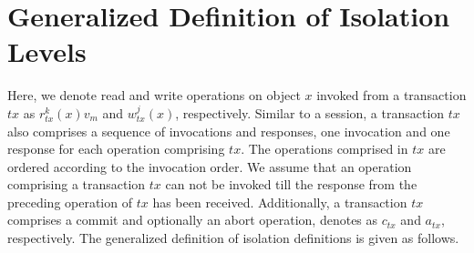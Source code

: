 \documentclass[acmlarge, ,11pt]{acmart}
\begin{document}


 \section{Generalized Definition of Isolation Levels}
 Here, we denote read and write operations on object $x$ invoked from a transaction $\mathit{tx}$ as $r^k_{\mathit{tx}}(x){v_m}$ and $w^j_{\mathit{tx}}(x)$, respectively. Similar to a session, a transaction ${\mathit{tx}}$ also comprises a sequence of invocations and responses, one invocation and one response for each operation comprising ${\mathit{tx}}$. The operations comprised in ${\mathit{tx}}$ are ordered according to the invocation order. We assume that an operation comprising a transaction ${\mathit{tx}}$ can not be invoked till the response from the preceding operation of ${\mathit{tx}}$ has been received. Additionally, a transaction ${\mathit{tx}}$ comprises a commit and optionally an abort operation, denotes as $c_\mathit{tx}$ and $a_\mathit{tx}$, respectively.  
 The generalized definition of isolation definitions is given as follows.  
\end{document}
